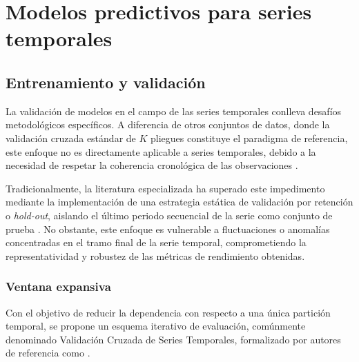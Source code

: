 
\cleardoublepage


\chapter{Modelos predictivos para series temporales}
\label{cap5}

\section{Entrenamiento y validación}
\label{cap5:traintest}

La validación de modelos en el campo de las series temporales conlleva desafíos metodológicos específicos. A diferencia de otros conjuntos de datos, donde la validación cruzada estándar de $K$ pliegues constituye el paradigma de referencia, este enfoque no es directamente aplicable a series temporales, debido a la necesidad de respetar la coherencia cronológica de las observaciones \parencite{ARIMA:BoxJenkins}.

Tradicionalmente, la literatura especializada ha superado este impedimento mediante la implementación de una estrategia estática de validación por retención o \textit{hold-out}, aislando el último periodo secuencial de la serie como conjunto de prueba \parencite{tashman2000out}. No obstante, este enfoque es vulnerable a fluctuaciones o anomalías concentradas en el tramo final de la serie temporal, comprometiendo la representatividad y robustez de las métricas de rendimiento obtenidas.

\subsection{Ventana expansiva}
\label{cap5:traintest:ventana}

Con el objetivo de reducir la dependencia con respecto a una única partición temporal, se propone un esquema iterativo de evaluación, comúnmente denominado Validación Cruzada de Series Temporales, formalizado por autores de referencia como \textcite{Suavizado:Hyndman}.

